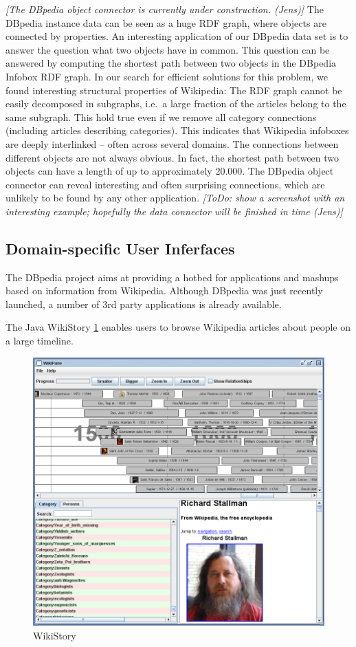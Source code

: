 \documentclass{llncs}
\newcommand{\todo}[1]{\emph{[ToDo: #1]}}
\begin{document}
\emph{[The DBpedia object connector is currently under construction. (Jens)]}
The DBpedia instance data can be seen as a huge RDF graph, where objects are connected by properties. An interesting application of our DBpedia data set is to answer the question what two objects have in common. This question can be answered by computing the shortest path between two objects in the DBpedia Infobox RDF graph. In our search for efficient solutions for this problem, we found interesting structural properties of Wikipedia: The RDF graph cannot be easily decomposed in subgraphs, i.e.~a large fraction of the articles belong to the same subgraph. This hold true even if we remove all category connections (including articles describing categories). This indicates that Wikipedia infoboxes are deeply interlinked -- often across several domains. The connections between different objects are not always obvious. In fact, the shortest path between two objects can have a length of up to approximately 20.000. The DBpedia object connector can reveal interesting and often surprising connections, which are unlikely to be found by any other application. \todo{show a screenshot with an interesting example; hopefully the data connector will be finished in time (Jens)}

\subsection{Domain-specific User Inferfaces}

The DBpedia project aims at providing a hotbed for applications and mashups based on information from Wikipedia. Although DBpedia was just recently launched, a number of 3rd party applications is already available.

The Java WikiStory \ref{fig:wikistory} enables users to browse Wikipedia articles about people on a large timeline.

\begin{figure}
	\centering
		\includegraphics[width=0.50\columnwidth]{wikistory}
	\caption{WikiStory}
	\label{fig:wikistory}
\end{figure}
\end{document}
